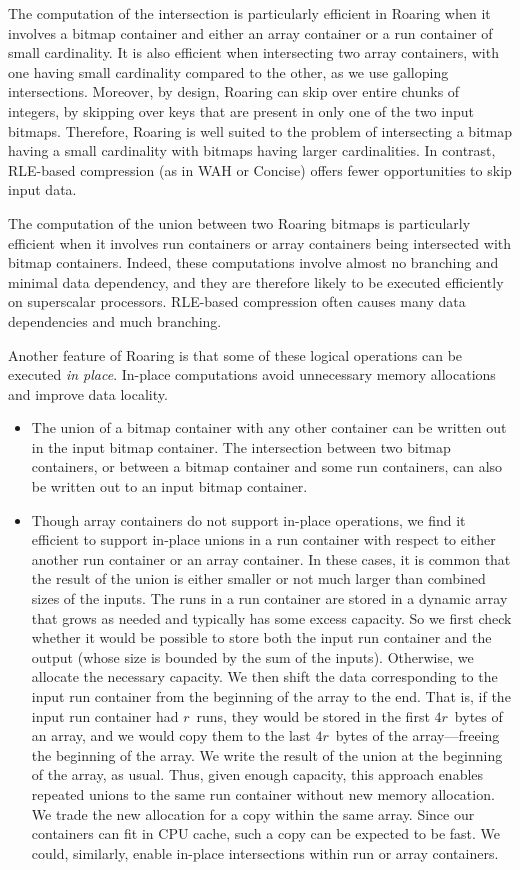 \documentclass[times]{speauth}
\begin{document}
The computation of the intersection is particularly efficient in Roaring when it involves a bitmap container and either an array container or a run container of small cardinality. It is also efficient when intersecting two array containers, with one having small cardinality compared to the other, as we use galloping intersections. Moreover, by design, Roaring can skip over entire chunks of integers, by skipping over keys that are present in only one of the two input bitmaps. Therefore, Roaring is well suited to the problem of intersecting a bitmap having a small cardinality with bitmaps having larger cardinalities. In contrast, RLE-based compression (as in WAH or Concise) offers fewer opportunities to skip input data.

The computation of the union between two Roaring bitmaps is particularly efficient when it involves run containers or array containers being intersected with bitmap containers. Indeed, these computations involve almost no branching and minimal data dependency, and they are therefore likely to be executed efficiently on superscalar processors. RLE-based compression often causes
many data dependencies and much branching.

Another feature of Roaring is that some  of these logical operations can be executed \emph{in place}.  In-place computations avoid unnecessary memory allocations and improve data locality.
\begin{itemize}
\item
The union of a bitmap container with any other container can be written out in the input bitmap container. The intersection between two bitmap containers, or between a bitmap container and some run containers, can also be written out to an input bitmap container.
\item  Though array containers do not support in-place operations, we find it efficient to support in-place unions in a run container with respect to  either another run container or an array container.
In these cases,  it is common that the result of the union is either
smaller or not much larger than combined sizes of the inputs.
The runs in a run container are stored
in a dynamic array that grows as needed
and typically has 
some excess capacity. So we first check whether it would be
possible to store both the input run container and the
output (whose size is bounded by the sum of the inputs).
Otherwise, we allocate the necessary capacity. We then shift
the data corresponding to the input run container from the beginning
of the array to the end. That is, 
if the input run container had $r$~runs, they would be stored in 
the first $4r$~bytes of an array, and we would copy them to the last $4r$~bytes of the array---freeing
the beginning of the array.  We write the result of the union
at the beginning of the array, as usual.
Thus, given enough capacity, this approach enables repeated
unions to the same run container without new memory allocation. We trade the new allocation for a copy within the same array. Since our containers can fit in CPU cache, such a copy can be expected to be fast.
We could, similarly, enable in-place intersections within run or array containers.
 \end{itemize}
\end{document}
